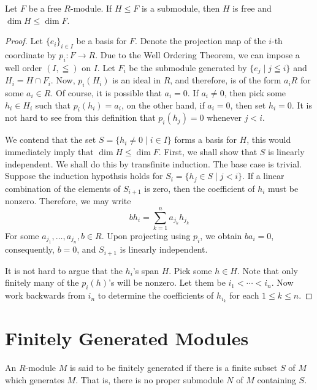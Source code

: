 \begin{theorem}
    Let $F$ be a free $R$-module. If $H\le F$ is a submodule, then $H$ is free and $\dim H\le\dim F$.
\end{theorem}
\begin{proof}
Let $\{e_i\}_{i\in I}$ be a basis for $F$. Denote the projection map of the $i$-th coordinate by $p_i: F\to R$. Due to the Well Ordering Theorem, we can impose a well order $(I,\leqq)$ on $I$. Let $F_i$ be the submodule generated by $\{e_j\mid j\leqq i\}$ and $H_i = H\cap F_i$. Now, $p_i(H_i)$ is an ideal in $R$, and therefore, is of the form $a_iR$ for some $a_i\in R$. Of course, it is possible that $a_i = 0$. If $a_i\ne 0$, then pick some $h_i\in H_i$ such that $p_i(h_i) = a_i$, on the other hand, if $a_i = 0$, then set $h_i = 0$. It is not hard to see from this definition that $p_i(h_j) = 0$ whenever $j < i$.

We contend that the set $S = \{h_i\ne 0\mid i\in I\}$ forms a basis for $H$, this would immediately imply that $\dim H\le\dim F$. First, we shall show that $S$ is linearly independent. We shall do this by transfinite induction. The base case is trivial. Suppose the induction hypothsis holds for $S_i = \{h_j\in S\mid j < i\}$. If a linear combination of the elements of $S_{i + 1}$ is zero, then the coefficient of $h_i$ must be nonzero. Therefore, we may write 
\begin{equation*}
    bh_i = \sum_{k = 1}^n a_{j_k}h_{j_k}
\end{equation*}
For some $a_{j_1},\ldots,a_{j_n},b\in R$. Upon projecting using $p_i$, we obtain $ba_i = 0$, consequently, $b = 0$, and $S_{i + 1}$ is linearly independent.

It is not hard to argue that the $h_i$'s span $H$. Pick some $h\in H$. Note that only finitely many of the $p_i(h)$'s will be nonzero. Let them be $i_1 < \cdots < i_n$. Now work backwards from $i_n$ to determine the coefficients of $h_{i_k}$ for each $1\le k\le n$.
\end{proof}

\section{Finitely Generated Modules}

\begin{definition}
    An $R$-module $M$ is said to be finitely generated if there is a finite subset $S$ of $M$ which generates $M$. That is, there is no proper submodule $N$ of $M$ containing $S$.
\end{definition}

